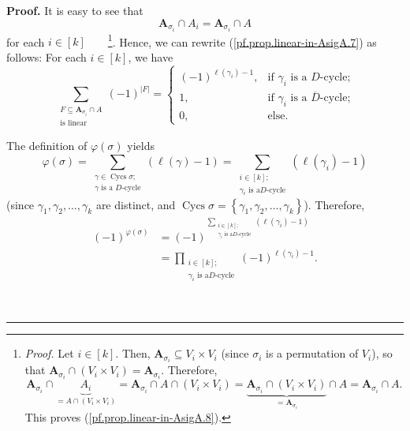 \documentclass[numbers=enddot,12pt,final,onecolumn,notitlepage]{scrartcl}%
\numberwithin{exer}{section}
\theoremstyle{definition}
\newenvironment{proof}[1][Proof]{\noindent\textbf{#1.} }{\ \rule{0.5em}{0.5em}}
\let\sumnonlimits\sum
\let\prodnonlimits\prod
\renewcommand{\sum}{\sumnonlimits\limits}
\renewcommand{\prod}{\prodnonlimits\limits}
\newenvironment{vershort}{}{}
\begin{document}
\begin{vershort}
\begin{proof}
It is easy to see that
\begin{equation}
\mathbf{A}_{\sigma_{i}}\cap A_{i}=\mathbf{A}_{\sigma_{i}}\cap A
\label{pf.prop.linear-in-AsigA.8}%
\end{equation}
for each $i\in\left[  k\right]  $\ \ \ \ \footnote{\textit{Proof.} Let
$i\in\left[  k\right]  $. Then, $\mathbf{A}_{\sigma_{i}}\subseteq V_{i}\times
V_{i}$ (since $\sigma_{i}$ is a permutation of $V_{i}$), so that
$\mathbf{A}_{\sigma_{i}}\cap\left(  V_{i}\times V_{i}\right)  =\mathbf{A}%
_{\sigma_{i}}$. Therefore,%
\[
\mathbf{A}_{\sigma_{i}}\cap\underbrace{A_{i}}_{=A\cap\left(  V_{i}\times
V_{i}\right)  }=\mathbf{A}_{\sigma_{i}}\cap A\cap\left(  V_{i}\times
V_{i}\right)  =\underbrace{\mathbf{A}_{\sigma_{i}}\cap\left(  V_{i}\times
V_{i}\right)  }_{=\mathbf{A}_{\sigma_{i}}}\cap A=\mathbf{A}_{\sigma_{i}}\cap
A.
\]
This proves (\ref{pf.prop.linear-in-AsigA.8}).}. Hence, we can rewrite
(\ref{pf.prop.linear-in-AsigA.7}) as follows: For each $i\in\left[  k\right]
$, we have%
\begin{equation}
\sum_{\substack{F\subseteq\mathbf{A}_{\sigma_{i}}\cap A\\\text{is linear}%
}}\left(  -1\right)  ^{\left\vert F\right\vert }=%
\begin{cases}
\left(  -1\right)  ^{\ell\left(  \gamma_{i}\right)  -1}, & \text{if }%
\gamma_{i}\text{ is a }D\text{-cycle;}\\
1, & \text{if }\gamma_{i}\text{ is a }\overline{D}\text{-cycle;}\\
0, & \text{else.}%
\end{cases}
\label{pf.prop.linear-in-AsigA.7b}%
\end{equation}


The definition of $\varphi\left(  \sigma\right)  $ yields%
\[
\varphi\left(  \sigma\right)  =\sum_{\substack{\gamma\in\operatorname*{Cycs}%
\sigma;\\\gamma\text{ is a }D\text{-cycle}}}\left(  \ell\left(  \gamma\right)
-1\right)  =\sum_{\substack{i\in\left[  k\right]  ;\\\gamma_{i}\text{ is a
}D\text{-cycle}}}\left(  \ell\left(  \gamma_{i}\right)  -1\right)
\]
(since $\gamma_{1},\gamma_{2},\ldots,\gamma_{k}$ are distinct, and
$\operatorname*{Cycs}\sigma=\left\{  \gamma_{1},\gamma_{2},\ldots,\gamma
_{k}\right\}  $). Therefore,%
\begin{align}
\left(  -1\right)  ^{\varphi\left(  \sigma\right)  }  &  =\left(  -1\right)
^{\sum_{\substack{i\in\left[  k\right]  ;\\\gamma_{i}\text{ is a
}D\text{-cycle}}}\left(  \ell\left(  \gamma_{i}\right)  -1\right)
}\nonumber\\
&  =\prod_{\substack{i\in\left[  k\right]  ;\\\gamma_{i}\text{ is a
}D\text{-cycle}}}\left(  -1\right)  ^{\ell\left(  \gamma_{i}\right)  -1}.
\label{pf.prop.linear-in-AsigA.sign}%
\end{align}



\end{proof}
\end{vershort}
\end{document}
